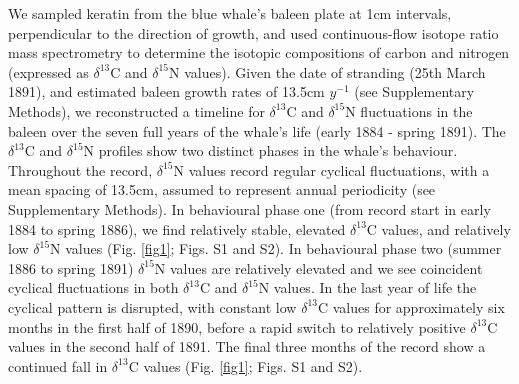 \documentclass[a4paper,12pt]{article}
\begin{document}

We sampled keratin from the blue whale's baleen plate at 1cm intervals, perpendicular to the direction of growth, and used continuous-flow isotope ratio mass spectrometry to determine the isotopic compositions of carbon and nitrogen (expressed as $\delta^{13}$C and $\delta^{15}$N values). 
Given the date of stranding (25th March 1891), and estimated baleen growth rates of 13.5cm $y^{-1}$ (see Supplementary Methods), we reconstructed a timeline for $\delta^{13}$C and $\delta^{15}$N fluctuations in the baleen over the seven full years of the whale's life (early 1884 - spring 1891). 
The $\delta^{13}$C and $\delta^{15}$N profiles show two distinct phases in the whale's behaviour. 
Throughout the record, $\delta^{15}$N values record regular cyclical fluctuations, with a mean spacing of 13.5cm, assumed to represent annual periodicity (see Supplementary Methods).  
In behavioural phase one (from record start in early 1884 to spring 1886), we find relatively stable, elevated $\delta^{13}$C values, and relatively low $\delta^{15}$N values (Fig. \ref{fig1}; Figs. S1 and S2). 
In behavioural phase two (summer 1886 to spring 1891) $\delta^{15}$N values are relatively elevated and we see coincident cyclical fluctuations in both $\delta^{13}$C and $\delta^{15}$N values. 
In the last year of life the cyclical pattern is disrupted, with constant low $\delta^{13}$C values for approximately six months in the first half of 1890, before a rapid switch to relatively positive $\delta^{13}$C values in the second half of 1891. 
The final three months of the record show a continued fall in $\delta^{13}$C values (Fig. \ref{fig1}; Figs. S1 and S2).

\end{document}
